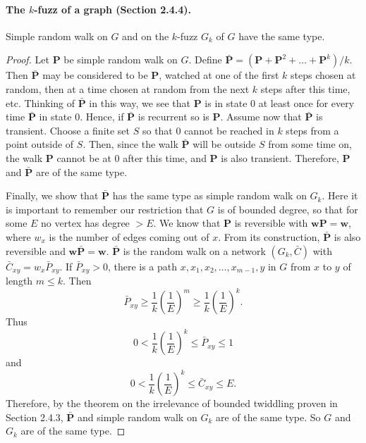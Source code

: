 \paragraph{The $k$-fuzz of a graph (Section 2.4.4).}
\begin{theorem}
Simple random walk on $G$ and on the $k$-fuzz $G_k$ of $G$ have the same type.
\end{theorem}
\begin{proof}
Let $\mathbf P$ be simple random walk on $G$. Define $\bar{\mathbf P}=(\mathbf P+\mathbf P^2+\ldots+\mathbf P^k)/k$. Then $\bar{\mathbf P}$ may be considered to be $\mathbf P$, watched at one of the first $k$ steps chosen at random, then at a time chosen at random from the next $k$ steps after this time, etc. Thinking of $\bar{\mathbf P}$ in this way, we see that $\mathbf P$ is in state $0$ at least once for every time $\bar{\mathbf P}$ in state $0$. Hence, if $\bar{\mathbf P}$ is recurrent so is $\mathbf P$. Assume now that $\bar{\mathbf P}$ is transient. Choose a finite set $S$ so that $0$ cannot be reached in $k$ steps from a point outside of $S$. Then, since the walk $\bar{\mathbf P}$ will be outside $S$ from some time on, the walk $\mathbf P$ cannot be at $0$ after this time, and $\mathbf P$ is also transient. Therefore, $\mathbf P$ and $\bar{\mathbf P}$ are of the same type.

Finally, we show that $\bar{\mathbf P}$ has the same type as simple random walk on $G_k$. Here it is important to remember our restriction that $G$ is of bounded degree, so that for some $E$ no vertex has degree $>E$. We know that $\mathbf P$ is reversible with $\mathbf w\mathbf P=\mathbf w$, where $w_x$ is the number of edges coming out of $x$. From its construction, $\bar{\mathbf P}$ is also reversible and $\mathbf w\bar{\mathbf P}=\mathbf w$. $\bar{\mathbf P}$ is the random walk on a network $(G_k,\bar C)$ with $\bar C_{xy}=w_x\bar P_{xy}$. If $\bar P_{xy}>0$, there is a path $x,x_1,x_2,\ldots,x_{m-1},y$ in $G$ from $x$ to $y$ of length $m\le k$. Then
\[
\bar P_{xy}\ge\frac1k\left(\frac1E\right)^m
\ge\frac1k\left(\frac1E\right)^k.
\]
Thus
\[
0<\frac1k\left(\frac1E\right)^k\le\bar P_{xy}\le1
\]
and
\[
0<\frac1k\left(\frac1E\right)^k\le\bar C_{xy}\le E.
\]
Therefore, by the theorem on the irrelevance of bounded twiddling proven in Section 2.4.3, $\bar{\mathbf P}$ and simple random walk on $G_k$ are of the same type. So $G$ and $G_k$ are of the same type.
\end{proof}
